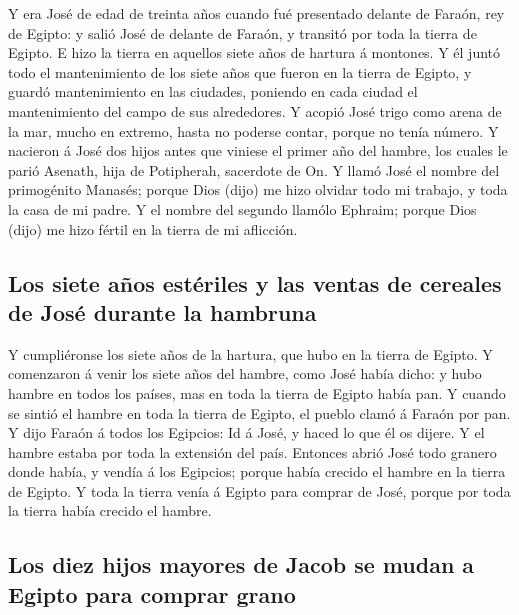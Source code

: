  Y era José de edad de treinta años cuando fué presentado
delante de Faraón, rey de Egipto: y salió José de delante de Faraón, y
transitó por toda la tierra de Egipto.  E hizo la tierra en
aquellos siete años de hartura á montones.  Y él juntó todo
el mantenimiento de los siete años que fueron en la tierra de Egipto, y
guardó mantenimiento en las ciudades, poniendo en cada ciudad el
mantenimiento del campo de sus alrededores.  Y acopió José
trigo como arena de la mar, mucho en extremo, hasta no poderse contar,
porque no tenía número.  Y nacieron á José dos hijos antes
que viniese el primer año del hambre, los cuales le parió Asenath, hija
de Potipherah, sacerdote de On.  Y llamó José el nombre del
primogénito Manasés; porque Dios (dijo) me hizo olvidar todo mi trabajo,
y toda la casa de mi padre.  Y el nombre del segundo
llamólo Ephraim; porque Dios (dijo) me hizo fértil en la tierra de mi
aflicción.

\hypertarget{los-siete-auxf1os-estuxe9riles-y-las-ventas-de-cereales-de-josuxe9-durante-la-hambruna}{%
\subsection{Los siete años estériles y las ventas de cereales de José
durante la
hambruna}\label{los-siete-auxf1os-estuxe9riles-y-las-ventas-de-cereales-de-josuxe9-durante-la-hambruna}}

 Y cumpliéronse los siete años de la hartura, que hubo en
la tierra de Egipto.  Y comenzaron á venir los siete años
del hambre, como José había dicho: y hubo hambre en todos los países,
mas en toda la tierra de Egipto había pan.  Y cuando se
sintió el hambre en toda la tierra de Egipto, el pueblo clamó á Faraón
por pan. Y dijo Faraón á todos los Egipcios: Id á José, y haced lo que
él os dijere.  Y el hambre estaba por toda la extensión del
país. Entonces abrió José todo granero donde había, y vendía á los
Egipcios; porque había crecido el hambre en la tierra de Egipto.
 Y toda la tierra venía á Egipto para comprar de José,
porque por toda la tierra había crecido el hambre.

\hypertarget{los-diez-hijos-mayores-de-jacob-se-mudan-a-egipto-para-comprar-grano}{%
\subsection{Los diez hijos mayores de Jacob se mudan a Egipto para
comprar
grano}\label{los-diez-hijos-mayores-de-jacob-se-mudan-a-egipto-para-comprar-grano}}

